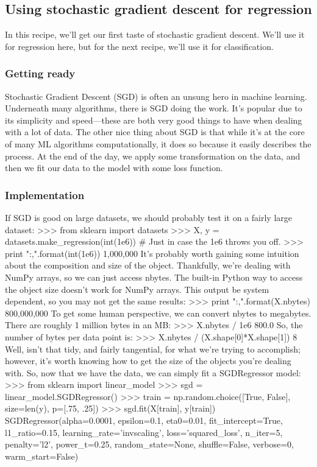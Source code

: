 \newpage
\subsection{Using stochastic gradient descent for regression}
In this recipe, we'll get our first taste of stochastic gradient descent. We'll use it for regression
here, but for the next recipe, we'll use it for classification.
\subsubsection{Getting ready}
Stochastic Gradient Descent (SGD) is often an unsung hero in machine learning.
Underneath many algorithms, there is SGD doing the work. It's popular due to its simplicity
and speed—these are both very good things to have when dealing with a lot of data.
The other nice thing about SGD is that while it's at the core of many ML algorithms
computationally, it does so because it easily describes the process. At the end of the day,
we apply some transformation on the data, and then we fit our data to the model with
some loss function.
\subsubsection{Implementation} %
If SGD is good on large datasets, we should probably test it on a fairly large dataset:
>>> from sklearn import datasets
>>> X, y = datasets.make_regression(int(1e6))
# Just in case the 1e6 throws you off.
>>> print "{:,}".format(int(1e6))
1,000,000
It's probably worth gaining some intuition about the composition and size of the object.
Thankfully, we're dealing with NumPy arrays, so we can just access nbytes. The built-in
Python way to access the object size doesn't work for NumPy arrays. This output be system
dependent, so you may not get the same results:
>>> print "{:,}".format(X.nbytes)
800,000,000
To get some human perspective, we can convert nbytes to megabytes. There are roughly
1 million bytes in an MB:
>>> X.nbytes / 1e6
800.0
So, the number of bytes per data point is:
>>> X.nbytes / (X.shape[0]*X.shape[1])
8
Well, isn't that tidy, and fairly tangential, for what we're trying to accomplish; however,
it's worth knowing how to get the size of the objects you're dealing with.
So, now that we have the data, we can simply fit a SGDRegressor model:
>>> from sklearn import linear_model
>>> sgd = linear_model.SGDRegressor()
>>> train = np.random.choice([True, False], size=len(y), p=[.75, .25])
>>> sgd.fit(X[train], y[train])
SGDRegressor(alpha=0.0001, epsilon=0.1, eta0=0.01,
fit_intercept=True, l1_ratio=0.15,
learning_rate='invscaling', loss='squared_loss',
n_iter=5, penalty='l2', power_t=0.25, random_state=None,
shuffle=False, verbose=0, warm_start=False)

